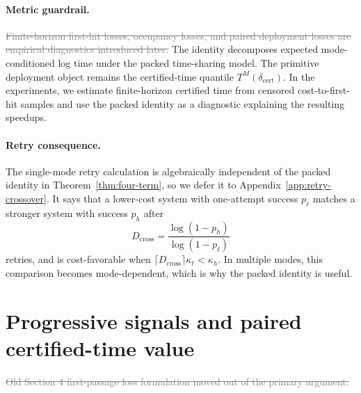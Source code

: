\documentclass{article}
\newcommand{\oldtext}[1]{\textcolor{gray}{\sout{#1}}}
\newcommand{\newtext}[1]{\textcolor{green!50!black}{#1}}
\begin{document}
\paragraph{Metric guardrail.}
\oldtext{Finite-horizon first-hit losses, occupancy losses, and paired deployment losses are empirical diagnostics introduced later.}
\newtext{The identity decomposes expected mode-conditioned log time under the packed time-sharing model. The primitive deployment object remains the certified-time quantile \(T^M(\delta_{\mathrm{cert}})\). In the experiments, we estimate finite-horizon certified time from censored cost-to-first-hit samples and use the packed identity as a diagnostic explaining the resulting speedups.}


\paragraph{Retry consequence.}
The single-mode retry calculation is algebraically independent of the packed identity in Theorem~\ref{thm:four-term}, so we defer it to Appendix~\ref{app:retry-crossover}.  It says that a lower-cost system with one-attempt success \(p_\ell\) matches a stronger system with success \(p_h\) after
\[
    D_{\mathrm{cross}}=\frac{\log(1-p_h)}{\log(1-p_\ell)}
\]
retries, and is cost-favorable when \(\lceil D_{\mathrm{cross}}\rceil\kappa_\ell<\kappa_h\).  In multiple modes, this comparison becomes mode-dependent, which is why the packed identity is useful.

\section{Progressive signals and paired certified-time value}
\label{sec:selection}

\oldtext{Old Section 4 first-passage loss formulation moved out of the primary argument.}
\end{document}
